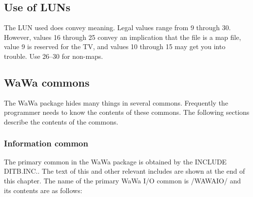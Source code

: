 \subsection{Use of LUNs}

The LUN used does convey meaning.  Legal values range from 9 through
30.  However, values 16 through 25 convey an implication that the file
is a map file, value 9 is reserved for the TV, and values 10 through
15 may get you into trouble.  Use 26--30 for non-maps.


\subsection{WaWa commons}
The WaWa package hides many things in several commons. Frequently the
programmer needs to know the contents of these commons.  The following
sections describe the contents of the commons.

\subsubsection{Information common}
The primary common in the WaWa package is obtained by the INCLUDE
DITB.INC..  The text of this and other relevant includes
are shown at the end of this chapter.  The name of the primary WaWa
I/O common is /WAWAIO/ and its contents are as follows:


